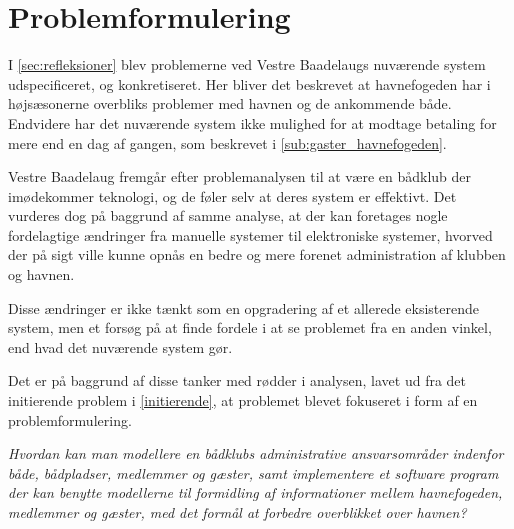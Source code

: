 \chapter{Problemformulering}
\label{cha:problemformulering}

I \cref{sec:refleksioner} blev problemerne ved Vestre Baadelaugs nuværende system udspecificeret, og konkretiseret. Her bliver det beskrevet at havnefogeden har i højsæsonerne overbliks problemer med havnen og de ankommende både. Endvidere har det nuværende system ikke mulighed for at modtage betaling for mere end en dag af gangen, som beskrevet i \cref{sub:gaster_havnefogeden}. 

Vestre Baadelaug fremgår efter problemanalysen til at være en bådklub der imødekommer teknologi, og de føler selv at deres system er effektivt. Det vurderes dog på baggrund af samme analyse, at der kan foretages nogle fordelagtige ændringer fra manuelle systemer til elektroniske systemer, hvorved der på sigt ville kunne opnås en bedre og mere forenet administration af klubben og havnen.

Disse ændringer er ikke tænkt som en opgradering af et allerede eksisterende system, men et forsøg på at finde fordele i at se problemet fra en anden vinkel, end hvad det nuværende system gør.

Det er på baggrund af disse tanker med rødder i analysen, lavet ud fra det initierende problem i \cref{initierende}, at problemet blevet fokuseret i form af en problemformulering. 

\begin{displayquote}
\textit{Hvordan kan man modellere en bådklubs administrative ansvarsområder indenfor både, bådpladser, medlemmer og gæster, samt implementere et software program der kan benytte modellerne til formidling af informationer mellem havnefogeden, medlemmer og gæster, med det formål at forbedre overblikket over havnen?}
\end{displayquote}

